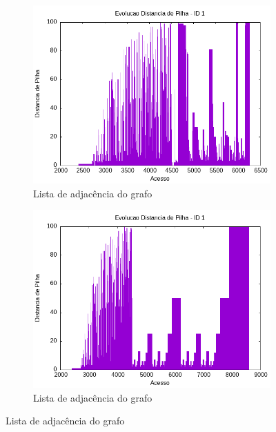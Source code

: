 \documentclass{article}
\begin{document}
\begin{figure}[H]
\begin{subfigure}[c]{0.4\textwidth}
    \end{subfigure}
    \hfill
    \begin{subfigure}[c]{0.4\textwidth}
        \centering
        \includegraphics[width=\textwidth]{./images/100-200/quickSort/registro_a-distp-1.png}
        \caption{Lista de adjacência do grafo}
        \label{fig:ac09}
    \end{subfigure}
    \hfill
    \begin{subfigure}[c]{0.4\textwidth}
        \centering
        \includegraphics[width=\textwidth]{./images/100-200/mergesort/registro_a-distp-1.png}
        \caption{Lista de adjacência do grafo}
        \label{fig:ac10}
    \end{subfigure}
    \hfill

\end{figure}
\end{document}

